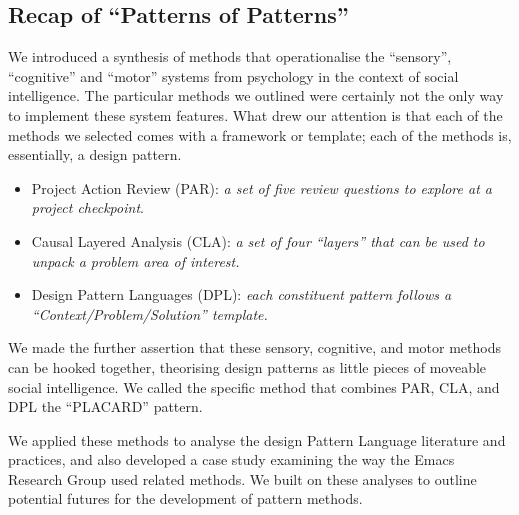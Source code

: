 \documentclass[acmlarge,timestamp]{acmart}
\begin{document}
\subsection{Recap of “Patterns of Patterns”}
\label{sec:org7c32ecc}

We introduced a synthesis of methods that operationalise the
“sensory”, “cognitive” and “motor” systems from psychology in the context of social intelligence.  The particular methods we outlined were certainly not the only way to implement these system features.  What drew our attention is that each of the methods we selected comes with a framework or template; each of the methods is, essentially, a design pattern.

\begin{itemize}
\item Project Action Review (PAR): \emph{a set of five review questions to explore at a project checkpoint}.
\item Causal Layered Analysis (CLA): \emph{a set of four “layers” that can
be used to unpack a problem area of interest.}
\item Design Pattern Languages (DPL): \emph{each constituent pattern follows a “Context/Problem/Solution” template.}
\end{itemize}

We made the further assertion that these sensory, cognitive, and motor
methods can be hooked together, theorising design patterns as little
pieces of moveable social intelligence.  We called the specific method
that combines PAR, CLA, and DPL the “PLACARD” pattern.

We applied these methods to analyse the design Pattern Language
literature and practices, and also developed a case study examining
the way the Emacs Research Group used related methods.  We built on
these analyses to outline potential futures for the development of
pattern methods.
\end{document}
